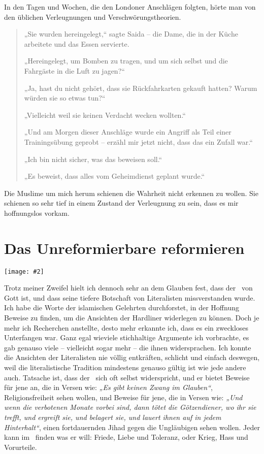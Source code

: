 \documentclass[12pt]{memoir}
\newcommand{\img}[3]{\begin{center}%
\texttt{[image: \#2]}\\{\small\em#3}%
\end{center}}
\begin{document}
In den Tagen und Wochen, die den Londoner Anschlägen folgten,
hörte man von den üblichen Verleugnungen und Verschwörungstheorien.

\begin{quote}
„Sie wurden hereingelegt,“ sagte Saida –
die Dame, die in der Küche arbeitete und das Essen servierte.

„Hereingelegt, um Bomben zu tragen, und um sich selbst
und die Fahrgäste in die Luft zu jagen?“

„Ja, hast du nicht gehört, dass sie Rückfahrkarten gekauft hatten?
Warum würden sie so etwas tun?“

„Vielleicht weil sie keinen Verdacht wecken wollten.“

„Und am Morgen dieser Anschläge wurde ein Angriff
als Teil einer Trainingsübung geprobt –
erzähl mir jetzt nicht, dass das ein Zufall war.“

„Ich bin nicht sicher, was das beweisen soll.“

„Es beweist, dass alles vom Geheimdienst geplant wurde.“
\end{quote}

Die Muslime um mich herum schienen die Wahrheit nicht erkennen zu wollen.
Sie schienen so sehr tief in einem Zustand der Verleugnung zu sein,
dass es mir hoffnungslos vorkam.


\chapter{Das Unreformierbare reformieren}

\img{scale=0.4}{Quranic_Script.jpg}{}

Trotz meiner Zweifel hielt ich dennoch sehr an dem Glauben fest,
dass der \Quran\ von Gott ist, und dass seine tiefere Botschaft
von Literalisten missverstanden wurde.
Ich habe die Worte der islamischen Gelehrten durchforstet,
in der Hoffnung Beweise zu finden,
um die Ansichten der Hardliner widerlegen zu können.
Doch je mehr ich Recherchen anstellte,
desto mehr erkannte ich, dass es ein zweckloses Unterfangen war.
Ganz egal wieviele stichhaltige Argumente ich vorbrachte,
es gab genauso viele – vielleicht sogar mehr – die ihnen widersprachen.
Ich konnte die Ansichten der Literalisten nie völlig entkräften,
schlicht und einfach deswegen, weil die literalistische Tradition
mindestens genauso gültig ist wie jede andere auch.
Tatsache ist, dass der \Quran\ sich oft selbst widerspricht,
und er bietet Beweise für jene an, die in Versen wie:
\emph{„Es gibt keinen Zwang im Glauben“},
Religionsfreiheit sehen wollen, und Beweise für jene,
die in Versen wie:
\emph{„Und wenn die verbotenen Monate vorbei sind,
dann tötet die Götzendiener, wo ihr sie trefft,
und ergreift sie, und belagert sie,
und lauert ihnen auf in jedem Hinterhalt“},
einen fortdauernden Jihad gegen die Ungläubigen sehen wollen.
Jeder kann im \Quran\ finden was er will:
Friede, Liebe und Toleranz, oder Krieg, Hass und Vorurteile.
\end{document}
